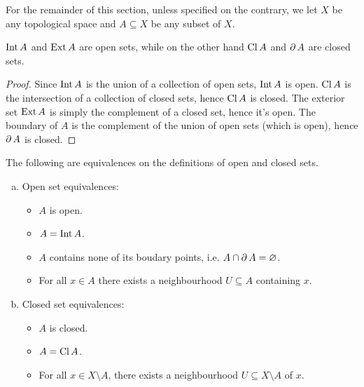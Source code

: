 \begin{remark}
    For the remainder of this section, unless specified on the contrary, we let
    \(X\) be any topological space and \(A \subseteq X\) be any subset of \(X\).
\end{remark}

\begin{proposition}\label{prop:open-close-int-ext-closure-boundary}
    \(\operatorname{Int} A\) and \(\operatorname{Ext} A\) are open sets, while on the other hand \(\operatorname{Cl} A\)
    and \(\operatorname{\partial} A\) are closed sets.
\end{proposition}

\begin{proof}
    Since \(\operatorname{Int} A\) is the union of a collection of open sets, \(\operatorname{Int} A\) is
    open. \(\operatorname{Cl} A\) is the intersection of a collection of closed sets, hence
    \(\operatorname{Cl} A\) is closed. The exterior set \(\operatorname{Ext} A\) is simply the complement
    of a closed set, hence it's open. The boundary of \(A\) is the complement of the
    union of open sets (which is open), hence \(\operatorname{\partial} A\) is closed.
\end{proof}

\begin{proposition}
    \label{prop:equiv-open-and-closed-set}
    The following are equivalences on the definitions of open and closed sets.
    \begin{enumerate}[(a)]\setlength\itemsep{0em}
        \item Open set equivalences:
              \begin{itemize}\setlength\itemsep{0em}
                  \item \(A\) is open.

                  \item \(A = \operatorname{Int} A\).

                  \item \(A\) contains none of its boudary points, i.e. \(A \cap \operatorname{\partial} A =
                        \varnothing\).

                  \item For all \(x \in A\) there exists a neighbourhood \(U \subseteq A\)
                        containing \(x\).
              \end{itemize}

        \item Closed set equivalences:
              \begin{itemize}\setlength\itemsep{0em}
                  \item \(A\) is closed.

                  \item \(A = \operatorname{Cl} A\).

                  \item For all \(x \in X \setminus A\), there exists a neighbourhood \(U
                        \subseteq X \setminus A\) of \(x\).
              \end{itemize}
    \end{enumerate}
\end{proposition}

